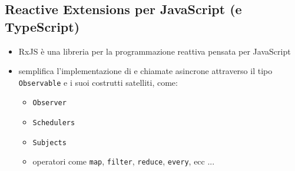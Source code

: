         \subsection{Reactive Extensions per JavaScript (e TypeScript)}\label{subsec:rxjs}

        \begin{frame}[fragile]{\insertsectionhead}
            \begin{block}{\insertsubsectionhead\footnotemark}
                \begin{itemize}
                    \item
                        RxJS è una libreria per la programmazione reattiva pensata per JavaScript
                    \item
                        semplifica l'implementazione di  e chiamate asincrone attraverso il tipo \texttt{Observable} e i suoi costrutti satelliti, come:
                        \begin{itemize}
                            \item \texttt{Observer}
                            \item \texttt{Schedulers}
                            \item \texttt{Subjects}
                            \item operatori come \texttt{map}, \texttt{filter}, \texttt{reduce}, \texttt{every}, ecc ...
                        \end{itemize}
                \end{itemize}
            \end{block}
        \end{frame}

